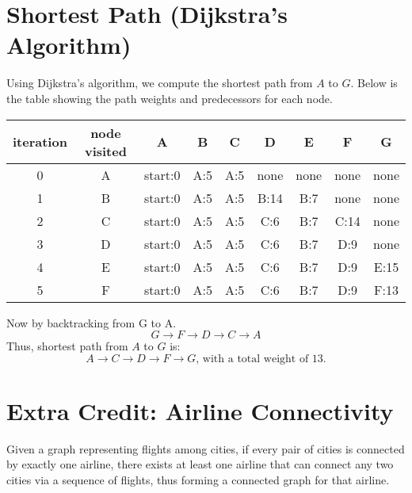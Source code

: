\documentclass[10pt]{article}
\begin{document}
\section{Shortest Path (Dijkstra's Algorithm)}

Using Dijkstra's algorithm, we compute the shortest path from \( A \) to \( G \). Below is the table showing the path weights and predecessors for each node.

\begin{table}[h]
  \centering
  \label{}
  \begin{tabular}{|c|c|c|c|c|c|c|c|c|}
  \hline
  iteration & node visited & A & B & C & D & E & F & G\\ \hline
  0 & A & start:0 & A:5 & A:5 & none & none & none & none\\ \hline
  1 & B & start:0 & A:5 & A:5 & B:14 & B:7 & none & none\\ \hline
  2 & C & start:0 & A:5 & A:5 & C:6 & B:7 & C:14 & none\\ \hline
  3 & D & start:0 & A:5 & A:5 & C:6 & B:7 & D:9 & none\\ \hline
  4 & E & start:0 & A:5 & A:5 & C:6 & B:7 & D:9 & E:15\\ \hline
  5 & F & start:0 & A:5 & A:5 & C:6 & B:7 & D:9 & F:13\\ \hline
  \end{tabular}
\end{table}
Now by backtracking from G to A. 
\[
G \rightarrow F \rightarrow D \rightarrow C \rightarrow A
\]
Thus, shortest path from \( A \) to \( G \) is:
\[A \rightarrow C \rightarrow D \rightarrow F \rightarrow G \text{, with a total weight of 13.}\]

\newpage

\section{Extra Credit: Airline Connectivity}

Given a graph representing flights among cities, if every pair of cities is connected by exactly one airline, there exists at least one airline that can connect any two cities via a sequence of flights, thus forming a connected graph for that airline.
\end{document}
